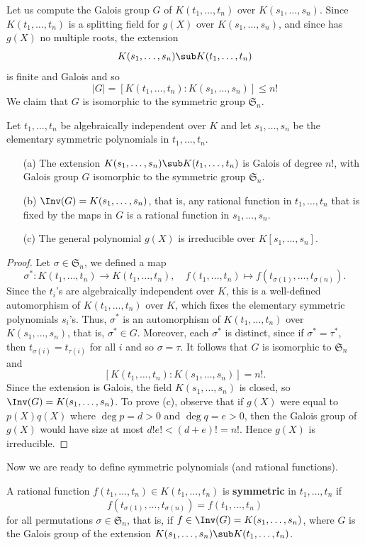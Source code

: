 Let us compute the Galois group $G$ of $K(t_1,\dots,t_n)$ over $K(s_1,\dots,s_n)$. Since $K(t_1,\dots,t_n)$ is a splitting field for $g(X)$ over $K(s_1,\dots,s_n)$, and since has $g(X)$ no multiple roots, the extension
\[K(s_1,\dots,s_n)\sub K(t_1,\dots,t_n)\]
is finite and Galois and so
\[|G|=[K(t_1,\dots,t_n):K(s_1,\dots,s_n)]\leq n!\]
We claim that $G$ is isomorphic to the symmetric group $\mathfrak{S}_n$.
\begin{proposition}\label{Galois group of general polynomial}
Let $t_1,\dots,t_n$ be algebraically independent over $K$ and let $s_1,\dots,s_n$ be the elementary symmetric polynomials in $t_1,\dots,t_n$.
\begin{itemize}
\item[(a)] The extension $K(s_1,\dots,s_n)\sub K(t_1,\dots,t_n)$ is Galois of degree $n!$, with Galois group $G$ isomorphic to the symmetric group $\mathfrak{S}_n$.
\item[(b)] $\Inv(G)=K(s_1,\dots,s_n)$, that is, any rational function in $t_1,\dots,t_n$ that is fixed by the maps in $G$ is a rational function in $s_1,\dots,s_n$.
\item[(c)] The general polynomial $g(X)$ is irreducible over $K[s_1,\dots,s_n]$. 
\end{itemize}
\end{proposition}
\begin{proof}
Let $\sigma\in\mathfrak{S}_n$, we defined a map
\[\sigma^*:K(t_1,\dots,t_n)\to K(t_1,\dots,t_n),\quad f(t_1,\dots,t_n)\mapsto f(t_{\sigma(1)},\dots,t_{\sigma(n)}).\]
Since the $t_i$'s are algebraically independent over $K$, this is a well-defined automorphism of $K(t_1,\dots,t_n)$ over $K$, which fixes the elementary symmetric polynomials $s_i$'s. Thus, $\sigma^*$ is an automorphism of $K(t_1,\dots,t_n)$ over $K(s_1,\dots,s_n)$, that is, $\sigma^*\in G$. Moreover, each $\sigma^*$ is distinct, since if $\sigma^*=\tau^*$, then $t_{\sigma(i)}=t_{\tau(i)}$ for all $i$ and so $\sigma=\tau$. It follows that $G$ is isomorphic to $\mathfrak{S}_n$ and
\[[K(t_1,\dots,t_n):K(s_1,\dots,s_n)]=n!.\]
Since the extension is Galois, the field $K(s_1,\dots,s_n)$ is closed, so $\Inv(G)=K(s_1,\dots,s_n)$. To prove (c), observe that if $g(X)$ were equal to $p(X)q(X)$ where $\deg p=d>0$ and $\deg q=e>0$, then the Galois group of $g(X)$ would have size at most $d!e!<(d+e)!=n!$. Hence $g(X)$ is irreducible.
\end{proof}
Now we are ready to define symmetric polynomials (and rational functions).
\begin{definition}
A rational function $f(t_1,\dots,t_n)\in K(t_1,\dots,t_n)$ is \textbf{symmetric} in $t_1,\dots,t_n$ if
\[f(t_{\sigma(1)},\dots,t_{\sigma(n)})=f(t_1,\dots,t_n)\]
for all permutations $\sigma\in\mathfrak{S}_n$, that is, if $f\in\Inv(G)=K(s_1,\dots,s_n)$, where $G$ is the Galois group of the extension $K(s_1,\dots,s_n)\sub K(t_1,\dots,t_n)$.
\end{definition}
